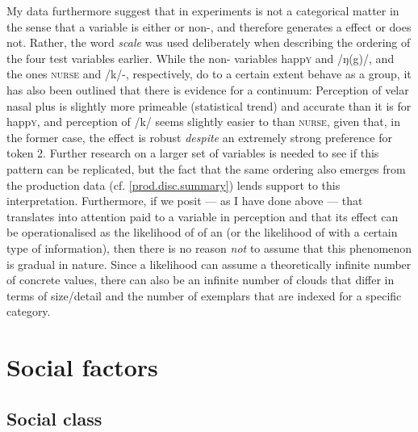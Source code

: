 My data furthermore suggest that  in   experiments is not a categorical matter in the sense that a variable is either  or non-, and therefore generates a  effect or does not.
Rather, the word \emph{scale} was used deliberately when describing the ordering of the four test variables earlier.
While the non- variables happ\textsc{y} and /ŋ(g)/, and the  ones \textsc{nurse} and /k/-, respectively, do to a certain extent behave as a group, it has also been outlined that there is evidence for a continuum: Perception of velar nasal plus is slightly more primeable (statistical trend) and accurate than it is for happ\textsc{y}, and perception of /k/ seems slightly easier to  than \textsc{nurse}, given that, in the former case, the effect is robust \emph{despite} an extremely strong preference for token 2.
Further research on a larger set of variables is needed to see if this pattern can be replicated, but the fact that the same ordering also emerges from the production data (cf. \ref{prod.disc.summary}) lends support to this interpretation.
Furthermore, if we posit --- as I have done above --- that  translates into attention paid to a variable in perception and that its effect can be operationalised as the likelihood of  of an  (or the likelihood of  with a certain type of information), then there is no reason \emph{not} to assume that this phenomenon is gradual in nature.
Since a likelihood can assume a theoretically infinite number of concrete values, there can also be an infinite number of  clouds that differ in terms of size/detail and the number of exemplars that are indexed for a specific category.

	\section{Social factors}
		\label{sec.perc_res.disc.social}

		\subsection{Social class}

